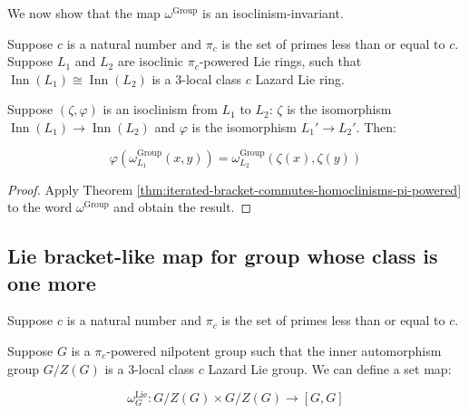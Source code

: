 \documentclass{ucetd}
\begin{document}
We now show that the map $\omega^{\text{Group}}$ is an isoclinism-invariant.

\begin{lemma}\label{lemma:omega-group-isoclinism-invariant}
  Suppose $c$ is a natural number and $\pi_c$ is the set of primes less
  than or equal to $c$. Suppose $L_1$ and $L_2$ are isoclinic
  $\pi_c$-powered Lie rings, such that $\operatorname{Inn}(L_1) \cong
  \operatorname{Inn}(L_2)$ is a $3$-local class $c$ Lazard Lie ring.

  Suppose $(\zeta,\varphi)$ is an isoclinism from $L_1$ to $L_2$:
  $\zeta$ is the isomorphism $\operatorname{Inn}(L_1) \to
  \operatorname{Inn}(L_2)$ and $\varphi$ is the isomorphism $L_1' \to
  L_2'$. Then:

  $$\varphi(\omega^{\text{Group}}_{L_1}(x,y)) = \omega^{\text{Group}}_{L_2}(\zeta(x),\zeta(y))$$
\end{lemma}

\begin{proof}
  Apply Theorem
  \ref{thm:iterated-bracket-commutes-homoclinisms-pi-powered} to the
  word $\omega^{\text{Group}}$ and obtain the result.
\end{proof}


\subsection{Lie bracket-like map for group whose class is one more}\label{sec:lie-bracket-like-map}

Suppose $c$ is a natural number and $\pi_c$ is the set of primes less
than or equal to $c$. 

Suppose $G$ is a $\pi_c$-powered nilpotent group such that the inner automorphism
group $G/Z(G)$ is a $3$-local class $c$ Lazard Lie group. We can
define a set map:

$$\omega_G^{\text{Lie}}: G/Z(G) \times G/Z(G) \to [G,G]$$
\end{document}
